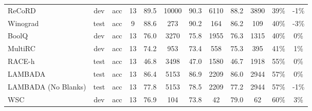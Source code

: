\documentclass{article}
\begin{document}
\begin{table}
{\begin{adjustwidth}{-1.4in}{-1.4in}
\begin{center}
\begin{tabular}{lccccccccccc}
              ReCoRD &   dev &      acc &  13 &        89.5 &                     10000 &                            90.3 &                      6110 &                            88.2 &                      3890 &                            39\% &                                                -1\% \\
            Winograd &  test &      acc &   9 &        88.6 &                       273 &                            90.2 &                       164 &                            86.2 &                       109 &                            40\% &                                                -3\% \\
               BoolQ &   dev &      acc &  13 &        76.0 &                      3270 &                            75.8 &                      1955 &                            76.3 &                      1315 &                            40\% &                                                 0\% \\
             MultiRC &   dev &      acc &  13 &        74.2 &                       953 &                            73.4 &                       558 &                            75.3 &                       395 &                            41\% &                                                 1\% \\
              RACE-h &  test &      acc &  13 &        46.8 &                      3498 &                            47.0 &                      1580 &                            46.7 &                      1918 &                            55\% &                                                 0\% \\
             LAMBADA &  test &      acc &  13 &        86.4 &                      5153 &                            86.9 &                      2209 &                            86.0 &                      2944 &                            57\% &                                                 0\% \\
 LAMBADA (No Blanks) &  test &      acc &  13 &        77.8 &                      5153 &                            78.5 &                      2209 &                            77.2 &                      2944 &                            57\% &                                                -1\% \\
                 WSC &   dev &      acc &  13 &        76.9 &                       104 &                            73.8 &                        42 &                            79.0 &                        62 &                            60\% &                                                 3\% \\

\end{tabular}
\end{center}
\end{adjustwidth}}
\end{table}
\end{document}
